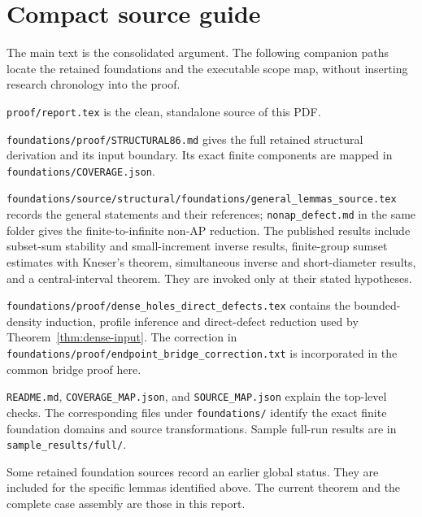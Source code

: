 \documentclass[11pt,letterpaper]{article}
\theoremstyle{definition}\newtheorem{definition}[theorem]{Definition}
\begin{document}
\section{Compact source guide}\label{app:sources}
The main text is the consolidated argument. The following companion paths locate the retained foundations and the executable scope map, without inserting research chronology into the proof.
\begin{description}[style=nextline,leftmargin=0pt]
\raggedright
\item[The consolidated proof]
\nolinkurl{proof/report.tex} is the clean, standalone source of this PDF.
\item[The structural theorem]
\nolinkurl{foundations/proof/STRUCTURAL86.md} gives the full retained structural derivation and its input boundary. Its exact finite components are mapped in \nolinkurl{foundations/COVERAGE.json}.
\item[General additive and non-AP inputs]
\nolinkurl{foundations/source/structural/foundations/general_lemmas_source.tex} records the general statements and their references; \nolinkurl{nonap_defect.md} in the same folder gives the finite-to-infinite non-AP reduction. The published results include subset-sum stability and small-increment inverse results, finite-group sumset estimates with Kneser's theorem, simultaneous inverse and short-diameter results, and a central-interval theorem. They are invoked only at their stated hypotheses.
\item[High-hole foundations]
\nolinkurl{foundations/proof/dense_holes_direct_defects.tex} contains the bounded-density induction, profile inference and direct-defect reduction used by Theorem~\ref{thm:dense-input}. The correction in \nolinkurl{foundations/proof/endpoint_bridge_correction.txt} is incorporated in the common bridge proof here.
\item[Executable scope and source identity]
\texttt{README.md}, \nolinkurl{COVERAGE_MAP.json}, and \nolinkurl{SOURCE_MAP.json} explain the top-level checks. The corresponding files under \nolinkurl{foundations/} identify the exact finite foundation domains and source transformations. Sample full-run results are in \nolinkurl{sample_results/full/}.
\end{description}
Some retained foundation sources record an earlier global status. They are included for the specific lemmas identified above. The current theorem and the complete case assembly are those in this report.
\end{document}
